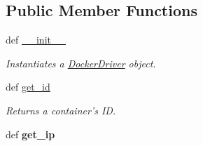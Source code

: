 \subsection*{Public Member Functions}
\begin{DoxyCompactItemize}
\item 
def \hyperlink{classhypervisor_1_1docker__driver_1_1DockerDriver_a0b9311d90850a8a145c2961654867f98}{\-\_\-\-\_\-init\-\_\-\-\_\-}
\begin{DoxyCompactList}\small\item\em Instantiates a \hyperlink{classhypervisor_1_1docker__driver_1_1DockerDriver}{Docker\-Driver} object. \end{DoxyCompactList}\item 
def \hyperlink{classhypervisor_1_1docker__driver_1_1DockerDriver_aedbd13cb76524d01894fcae539444f1b}{get\-\_\-id}
\begin{DoxyCompactList}\small\item\em Returns a container's I\-D. \end{DoxyCompactList}\item 
\hypertarget{classhypervisor_1_1docker__driver_1_1DockerDriver_a56041a2a0afad5971b1fb5cb465b6ff6}{def {\bfseries get\-\_\-ip}}\label{classhypervisor_1_1docker__driver_1_1DockerDriver_a56041a2a0afad5971b1fb5cb465b6ff6}


\end{DoxyCompactItemize}
